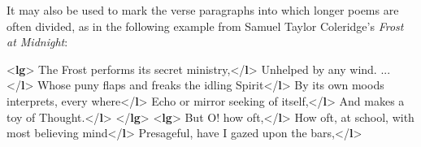 It may also be used to mark the verse paragraphs into which longer poems are often divided, as in the following example from Samuel Taylor Coleridge's \textit{Frost at Midnight}: \par\bgroup{}\exampleFont \begin{shaded}\noindent\mbox{}{<\textbf{lg}>}\mbox{}\newline 
{}The Frost performs its secret ministry,{</\textbf{l}>}\mbox{}\newline 
{}Unhelped by any wind. ...{</\textbf{l}>}\mbox{}\newline 
{}Whose puny flaps and freaks the idling Spirit{</\textbf{l}>}\mbox{}\newline 
{}By its own moods interprets, every where{</\textbf{l}>}\mbox{}\newline 
{}Echo or mirror seeking of itself,{</\textbf{l}>}\mbox{}\newline 
{}And makes a toy of Thought.{</\textbf{l}>}\mbox{}\newline 
{</\textbf{lg}>}\mbox{}\newline 
{<\textbf{lg}>}\mbox{}\newline 
{}But O! how oft,{</\textbf{l}>}\mbox{}\newline 
{}How oft, at school, with most believing mind{</\textbf{l}>}\mbox{}\newline 
{}Presageful, have I gazed upon the bars,{</\textbf{l}>}\mbox{}\newline 

\end{shaded}
